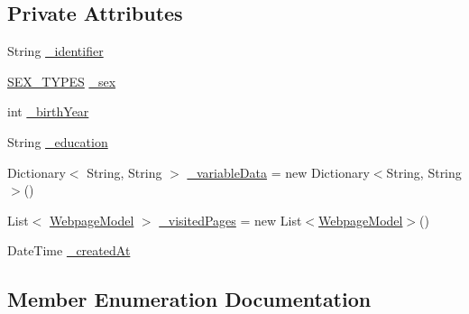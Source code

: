 \subsection*{Private Attributes}
\begin{DoxyCompactItemize}
\item 
String \hyperlink{class_web_analyzer_1_1_models_1_1_base_1_1_experiment_participant_a78f7ef6a042a9c3b2b35618931706ee6}{\+\_\+identifier}
\item 
\hyperlink{class_web_analyzer_1_1_models_1_1_base_1_1_experiment_participant_a38a0a0bc1d3ad083204da1de1fb93754}{S\+E\+X\+\_\+\+T\+Y\+P\+E\+S} \hyperlink{class_web_analyzer_1_1_models_1_1_base_1_1_experiment_participant_a429b36341a5a5c2a52e50c5f96afa69d}{\+\_\+sex}
\item 
int \hyperlink{class_web_analyzer_1_1_models_1_1_base_1_1_experiment_participant_a427f4aec241735ad90e082b285dc4a6b}{\+\_\+birth\+Year}
\item 
String \hyperlink{class_web_analyzer_1_1_models_1_1_base_1_1_experiment_participant_ad23c640c3cbaef32fff1f457dd1f6031}{\+\_\+education}
\item 
Dictionary$<$ String, String $>$ \hyperlink{class_web_analyzer_1_1_models_1_1_base_1_1_experiment_participant_a2672843dcbe74068d5654320285c3dae}{\+\_\+variable\+Data} = new Dictionary$<$String, String$>$()
\item 
List$<$ \hyperlink{class_web_analyzer_1_1_models_1_1_data_model_1_1_webpage_model}{Webpage\+Model} $>$ \hyperlink{class_web_analyzer_1_1_models_1_1_base_1_1_experiment_participant_a8aae8ea941b9ae583c9747d70fe31469}{\+\_\+visited\+Pages} = new List$<$\hyperlink{class_web_analyzer_1_1_models_1_1_data_model_1_1_webpage_model}{Webpage\+Model}$>$()
\item 
Date\+Time \hyperlink{class_web_analyzer_1_1_models_1_1_base_1_1_experiment_participant_a8c3c2f0bc432f0ae40d375246b8cb7c2}{\+\_\+created\+At}
\end{DoxyCompactItemize}


\subsection{Member Enumeration Documentation}
\hypertarget{class_web_analyzer_1_1_models_1_1_base_1_1_experiment_participant_a38a0a0bc1d3ad083204da1de1fb93754}{}
